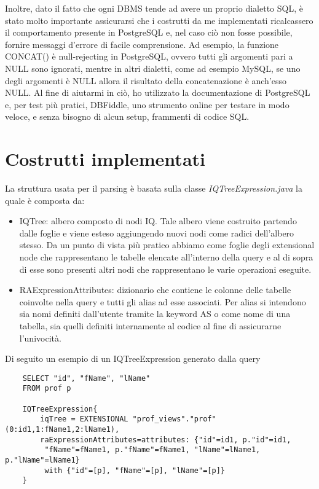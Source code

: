 Inoltre, dato il fatto che ogni DBMS tende ad avere un proprio dialetto SQL, è stato molto importante assicurarsi che i costrutti da me implementati ricalcassero il
comportamento presente in PostgreSQL e, nel caso ciò non fosse possibile, fornire messaggi d'errore di facile comprensione. Ad esempio, la funzione CONCAT() 
è null-rejecting in PostgreSQL, ovvero tutti gli argomenti pari a NULL sono ignorati, mentre in altri dialetti, come ad esempio MySQL, se uno degli argomenti è NULL allora il risultato
della concatenazione è anch'esso NULL.
Al fine di aiutarmi in ciò, ho utilizzato la documentazione di PostgreSQL e, per test più pratici, DBFiddle, uno strumento online per testare in modo veloce, e
senza bisogno di alcun setup, frammenti di codice SQL.


\section{Costrutti implementati}
\label{sec:implementation}
La struttura usata per il parsing è basata sulla classe \textit{IQTreeExpression.java} la quale è composta da:
\begin{itemize}
    \item IQTree: albero composto di nodi IQ. Tale albero viene costruito partendo dalle foglie e viene esteso aggiungendo nuovi nodi come radici dell'albero stesso. Da un punto di vista
          più pratico abbiamo come foglie degli extensional node che rappresentano le tabelle elencate all'interno della query e al di sopra di esse sono presenti altri nodi che
          rappresentano le varie operazioni eseguite.
    \item RAExpressionAttributes: dizionario che contiene le colonne delle tabelle coinvolte nella query e tutti gli alias ad esse associati. Per alias si intendono sia nomi definiti
          dall'utente tramite la keyword AS o come nome di una tabella, sia quelli definiti internamente al codice al fine di assicurarne l'univocità.
\end{itemize}
Di seguito un esempio di un IQTreeExpression generato dalla query
\begin{verbatim}
    SELECT "id", "fName", "lName"
    FROM prof p

    IQTreeExpression{
        iqTree = EXTENSIONAL "prof_views"."prof"(0:id1,1:fName1,2:lName1), 
        raExpressionAttributes=attributes: {"id"=id1, p."id"=id1, 
         "fName"=fName1, p."fName"=fName1, "lName"=lName1, p."lName"=lName1} 
         with {"id"=[p], "fName"=[p], "lName"=[p]}
    } 
    \end{verbatim}

